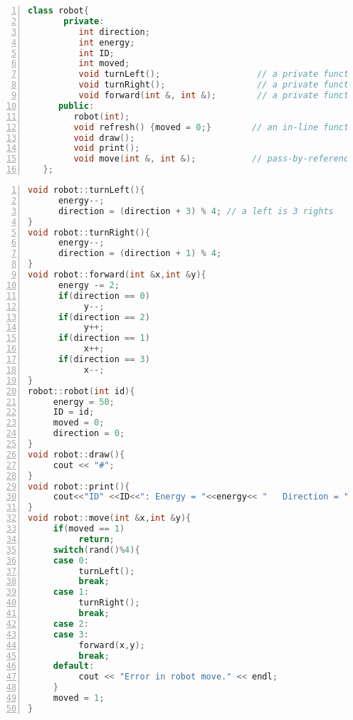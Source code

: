 
\begin{minipage}{\textwidth}
\renewcommand*\thelstnumber{\the\value{lstnumber}a}
\begin{lstlisting}[language=C++,numbers = left,xleftmargin=4.0ex, basicstyle=\small, emph={direction,energy,ID,moved},emphstyle = \color{\mycolor},
showstringspaces=false,
caption = {The declaration of the \codefont{robot} class.  It has four private data members, three private member functions, and five public member functions.},
label={listing:roboth}]
    class robot{
       private:
          int direction;
          int energy;
          int ID;
          int moved;  
          void turnLeft();                   // a private function
          void turnRight();                  // a private function
          void forward(int &, int &);        // a private function
      public:
         robot(int);                        
         void refresh() {moved = 0;}        // an in-line function
         void draw();
         void print();
         void move(int &, int &);           // pass-by-reference arguments
   };
\end{lstlisting}
\end{minipage}

\begin{minipage}{\textwidth}
\renewcommand*\thelstnumber{\the\value{lstnumber}b}
\begin{lstlisting}[language=C++,numbers = left,xleftmargin=4.0ex, basicstyle=\small, emph={energy,direction,ID,id,x,y,moved},emphstyle = \color{\mycolor},
showstringspaces=false,
caption = {The definitions of the member functions of the \codefont{robot} class.},
label={listing:robotcpp}]
void robot::turnLeft(){
      energy--;
      direction = (direction + 3) % 4; // a left is 3 rights
}
void robot::turnRight(){
      energy--;
      direction = (direction + 1) % 4;
}
void robot::forward(int &x,int &y){
      energy -= 2;
      if(direction == 0)
           y--;    
      if(direction == 2)
           y++;    
      if(direction == 1)
           x++;    
      if(direction == 3)
           x--;    
}
robot::robot(int id){
     energy = 50;
     ID = id;
     moved = 0;
     direction = 0;
}
void robot::draw(){
     cout << "#";
}
void robot::print(){
     cout<<"ID" <<ID<<": Energy = "<<energy<< "   Direction = "<<direction;
}
void robot::move(int &x,int &y){
     if(moved == 1)
          return;
     switch(rand()%4){
     case 0:
          turnLeft();
          break;
     case 1:
          turnRight();
          break;
     case 2:
     case 3: 
          forward(x,y);
          break;
     default: 
          cout << "Error in robot move." << endl;
     }
     moved = 1;
}
\end{lstlisting}
\end{minipage}

